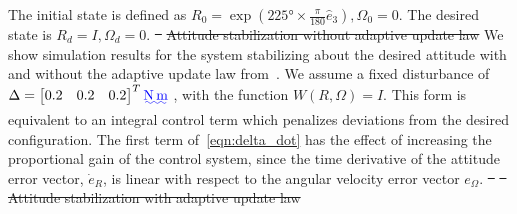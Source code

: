 \documentclass[10pt,fleqn]{IJCAS}  %
\providecommand{\DIFadd}[1]{{\protect\color{blue}\uwave{#1}}} %
\providecommand{\DIFdel}[1]{{\protect\color{red}\sout{#1}}}                      %
\providecommand{\DIFdelbegin}{} %
\providecommand{\DIFdelend}{} %
\providecommand{\DIFdelFL}[1]{\DIFdel{#1}} %
\begin{document}
\begin{multicols}{2}
The initial state is defined as \(R_0 =  \exp(\ang{225} \times \frac{\pi}{180} \hat{e}_3), \Omega_0 = 0\). 
The desired state is \( R_d = I,\Omega_d = 0\).
\DIFdelbegin %
\DIFdelFL{~
    }%
{%
\DIFdelFL{Attitude stabilization without adaptive update law}}
\DIFdelend We show simulation results for the system stabilizing about the desired attitude with and without the adaptive update law from~.
We assume a fixed disturbance of \(\Delta = \begin{bmatrix} 0.2 & 0.2 & 0.2 \end{bmatrix}^T \DIFadd{\si{\newton\meter}}\) , with the function \( W(R,\Omega) = I \).
This form is equivalent to an integral control term which penalizes deviations from the desired configuration.
The first term of~\cref{eqn:delta_dot} has the effect of increasing the proportional gain of the control system, since the time derivative of the attitude error vector, \( \dot{e}_{R} \), is linear with respect to the angular velocity error vector \( e_\Omega\).
\DIFdelbegin %
\DIFdelFL{~
    }%
\DIFdelFL{~
    }%
{%
\DIFdelFL{Attitude stabilization with adaptive update law}}
\DIFdelend 


\end{multicols}
\end{document}
